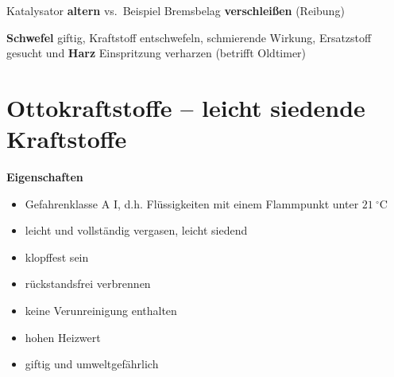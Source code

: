 Katalysator \textbf{altern} vs.~Beispiel Bremsbelag
\textbf{verschleißen} (Reibung)

\textbf{Schwefel} giftig, Kraftstoff entschwefeln, schmierende Wirkung,
Ersatzstoff gesucht und \textbf{Harz} Einspritzung verharzen (betrifft
Oldtimer)

\section{Ottokraftstoffe -- leicht siedende
Kraftstoffe}\label{ottokraftstoffe-leicht-siedende-kraftstoffe}

\textbf{Eigenschaften}

\begin{itemize}
\item
  Gefahrenklasse A I, d.h. Flüssigkeiten mit einem Flammpunkt unter
  $21~^\circ\text{C}$
\item
  leicht und vollständig vergasen, leicht siedend
\item
  klopffest sein
\item
  rückstandsfrei verbrennen
\item
  keine Verunreinigung enthalten
\item
  hohen Heizwert
\item
  giftig und umweltgefährlich
\end{itemize}

